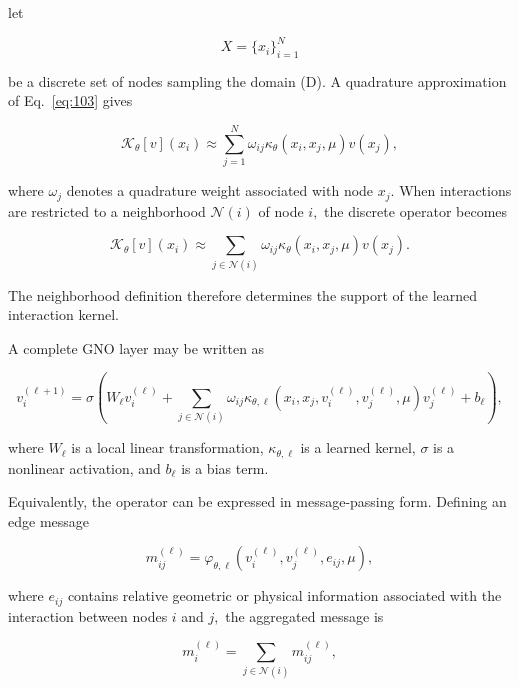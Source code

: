let

\begin{equation}
\label{eq:104}
X=\{x_i\}_{i=1}^{N}
\end{equation}

be a discrete set of nodes sampling the domain (D). A quadrature approximation of Eq.~\eqref{eq:103} gives

\begin{equation}
\label{eq:105}
\mathcal K_{\theta}[v](x_i)\approx\sum_{j=1}^{N}\omega_{ij}\kappa_{\theta}(x_i,x_j,\mu)v(x_j),
\end{equation}

where \(\omega_{j}\) denotes a quadrature weight associated with node \(x_{j} .\) When interactions are restricted to a neighborhood \(\mathcal{N} ( i )\) of node \(i ,\) the discrete operator becomes

\begin{equation}
\label{eq:106}
\mathcal K_{\theta}[v](x_i)\approx\sum_{j\in\mathcal N(i)}\omega_{ij}\kappa_{\theta}(x_i,x_j,\mu)v(x_j).
\end{equation}

The neighborhood definition therefore determines the support of the learned interaction kernel.

A complete GNO layer may be written as

\begin{equation}
\label{eq:107}
v_i^{(\ell+1)}=\sigma\left(W_{\ell}v_i^{(\ell)}+\sum_{j\in\mathcal N(i)}\omega_{ij}\kappa_{\theta,\ell}(x_i,x_j,v_i^{(\ell)},v_j^{(\ell)},\mu)v_j^{(\ell)}+b_{\ell}\right),
\end{equation}

where \(W_{\ell}\) is a local linear transformation, \(\kappa_{\theta , \ell}\) is a learned kernel, \(\sigma\) is a nonlinear activation, and \(b_{\ell}\) is a bias term.

Equivalently, the operator can be expressed in message-passing form. Defining an edge message

\begin{equation}
\label{eq:108}
m_{ij}^{(\ell)}=\varphi_{\theta,\ell}(v_i^{(\ell)},v_j^{(\ell)},e_{ij},\mu),
\end{equation}

where \(e_{i j}\) contains relative geometric or physical information associated with the interaction between nodes \(i\) and \(j ,\) the aggregated message is

\begin{equation}
\label{eq:109}
m_i^{(\ell)}=\sum_{j\in\mathcal N(i)}m_{ij}^{(\ell)},
\end{equation}

